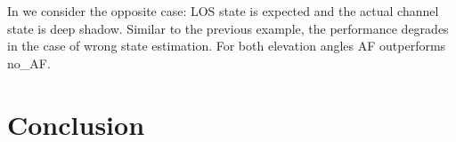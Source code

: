 \documentclass[conference]{IEEEtran}
\begin{document}
In  we consider the opposite case: 
LOS state is expected and the actual channel state is deep shadow. 
Similar to the previous example, the performance degrades in the case of wrong state estimation. For both elevation angles AF outperforms no\_AF.





\section{Conclusion}
\label{sec:conclusion}



\end{document}
